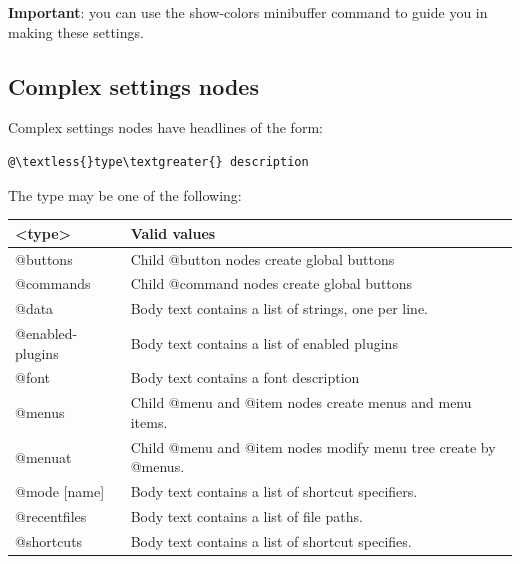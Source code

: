 \documentclass[a4paper,10pt,english]{sphinxmanual}
\begin{document}
\textbf{Important}: you can use the show-colors minibuffer command to guide you in making these settings.


\subsection{Complex settings nodes}
\label{customizing:complex-settings-nodes}
Complex settings nodes have headlines of the form:

\begin{Verbatim}[commandchars=\\\{\}]
@\textless{}type\textgreater{} description
\end{Verbatim}

The type may be one of the following:

\begin{tabulary}{\linewidth}{|L|L|}
\hline

\textless{}type\textgreater{}
 & 
Valid values
\\\hline

@buttons
 & 
Child @button nodes create global buttons
\\\hline

@commands
 & 
Child @command nodes create global buttons
\\\hline

@data
 & 
Body text contains a list of strings, one per line.
\\\hline

@enabled-plugins
 & 
Body text contains a list of enabled plugins
\\\hline

@font
 & 
Body text contains a font description
\\\hline

@menus
 & 
Child @menu and @item nodes create menus and menu items.
\\\hline

@menuat
 & 
Child @menu and @item nodes modify menu tree create by @menus.
\\\hline

@mode {[}name{]}
 & 
Body text contains a list of shortcut specifiers.
\\\hline

@recentfiles
 & 
Body text contains a list of file paths.
\\\hline

@shortcuts
 & 
Body text contains a list of shortcut specifies.
\\\hline
\end{tabulary}
\end{document}
